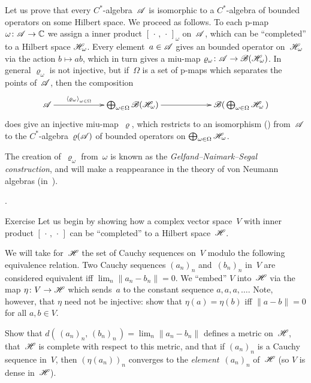 \documentclass[main]{subfiles}
\begin{document}
\begin{parsec}%
\begin{point}%
Let us prove that every $C^*$-algebra~$\mathscr{A}$
is isomorphic
to a $C^*$-algebra
of bounded operators on some Hilbert space.
We proceed as follows.
To each p-map $\omega\colon \mathscr{A}\to\mathbb{C}$
we assign a inner product $[\,\cdot\,,\,\cdot\,]_\omega$ on~$\mathscr{A}$,
which can be ``completed'' to a Hilbert space $\mathscr{H}_\omega$.
Every element~$a\in \mathscr{A}$ gives an bounded operator on~$\mathscr{H}_\omega$
via the action $b\mapsto ab$, which in turn gives a 
miu-map $\varrho_\omega\colon \mathscr{A}\to \mathscr{B} (\mathscr{H}_\omega)$.
In general $\varrho_\omega$ is not injective,
but if~$\Omega$ is a set of p-maps which separates the
points of~$\mathscr{A}$,
then the composition
\begin{equation*}
	\xymatrix@C=6em{
		\scrA\ar[r]^-{\left<\varrho_\omega\right>_{\omega\in \Omega}}
		&
		\bigoplus_{\omega\in\Omega} \scrB(\scrH_\omega)
		\ar[r]
		&
		\scrB(\,\bigoplus_{\omega\in\Omega}\scrH_\omega\,)
	}
\end{equation*}
does give an injective miu-map~$\varrho$,
which restricts to an isomorphism 
()
from~$\mathscr{A}$
to the $C^*$-algebra~$\varrho(\mathscr{A})$
of bounded operators
on $\bigoplus_{\omega\in \Omega} \mathscr{H}_\omega$.

The creation of~$\varrho_\omega$ from~$\omega$
is known as the \emph{Gelfand--Naimark--Segal construction},
and will make a reappearance in the theory of von Neumann algebras
(in~).

.
\end{point}
\begin{point}{Exercise}%
Let us begin by showing how a complex vector space~$V$
with inner product
$[\,\cdot\,,\,\cdot\,]$ can be ``completed'' to a Hilbert space~$\mathscr{H}$.

We will take for~$\mathscr{H}$ the set of Cauchy sequences on~$V$
modulo the following equivalence relation.
Two Cauchy sequences $(a_n)_n$ and~$(b_n)_n$ in~$V$
are considered equivalent
iff $\lim_n \|a_n-b_n\|=0$.
We ``embed'' $V$ into~$\mathscr{H}$ via the map $\eta\colon V\to \mathscr{H}$
which sends~$a$ to
the constant sequence $a,a,a,\dotsc$.
Note, however, that $\eta$ need not be injective:
show that $\eta(a)=\eta(b)$ iff $\|a-b\|=0$ for all $a,b\in V$.

Show that $d(\,(a_n)_n,\,(b_n)_n\,) = \lim_n \|a_n-b_n\|$
defines a metric on~$\mathscr{H}$,
that~$\mathscr{H}$ is complete with respect to this metric,
and that if $(a_n)_n$ is a Cauchy sequence in~$V$,
then $(\eta(a_n))_n$ converges to the \emph{element}~$(a_n)_n$ of~$\mathscr{H}$
(so $V$ is dense in~$\mathscr{H}$).


\end{point}
\end{parsec}
\end{document}

